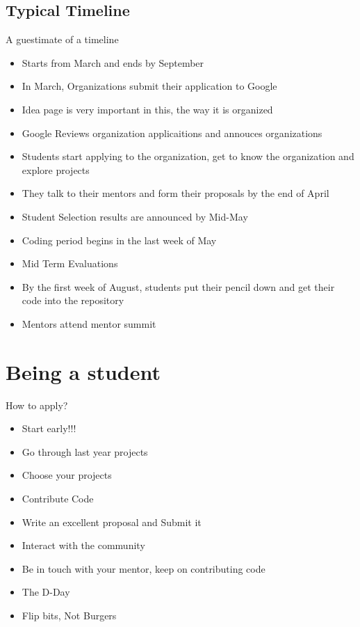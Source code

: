 \documentclass{beamer}
\begin{document}
\subsection{Typical Timeline}
\begin{frame}{A guestimate of a timeline}
\begin{itemize}
\pause
\item Starts from March and ends by September \pause
\item In March, Organizations submit their application to Google \pause
\item Idea page is very important in this, the way it is organized \pause
\item Google Reviews organization applicaitions and annouces organizations \pause
\item Students start applying to the organization, get to know the organization and explore projects \pause
\item They talk to their mentors and form their proposals by the end of April \pause
\item Student Selection results are announced by Mid-May \pause
\item Coding period begins in the last week of May \pause
\item Mid Term Evaluations \pause
\item By the first week of August, students put their pencil down and get their code into the repository \pause
\item Mentors attend mentor summit
\end{itemize}
\end{frame}

\section{Being a student}
\begin{frame}{How to apply?}
\begin{itemize}
\item Start early!!! \pause
\item Go through last year projects \pause
\item Choose your projects \pause
\item Contribute Code \pause
\item Write an excellent proposal and Submit it \pause
\item Interact with the community
\item Be in touch with your mentor, keep on contributing code \pause
\item The D-Day \pause
\item Flip bits, Not Burgers 
\end{itemize}
\end{frame}
\end{document}
